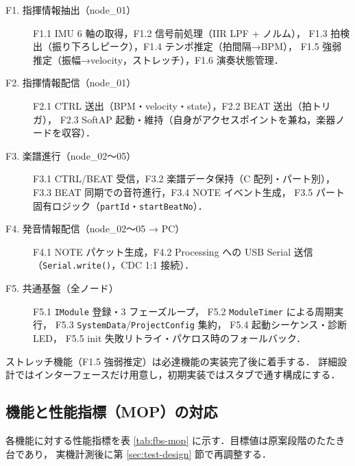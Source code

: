 \documentclass[lualatex,book,paper=a4paper,jafontsize=11.5pt,jafontscale=1.05]{jlreq}
\begin{document}
\begin{description}
  \item[F1. 指揮情報抽出（node\_01）]
    F1.1 IMU 6 軸の取得，F1.2 信号前処理（IIR LPF + ノルム），
    F1.3 拍検出（振り下ろしピーク），F1.4 テンポ推定（拍間隔→BPM），
    F1.5 強弱推定（振幅→velocity，ストレッチ），F1.6 演奏状態管理．
  \item[F2. 指揮情報配信（node\_01）]
    F2.1 CTRL 送出（BPM・velocity・state），F2.2 BEAT 送出（拍トリガ），
    F2.3 SoftAP 起動・維持（自身がアクセスポイントを兼ね，楽器ノードを収容）．
  \item[F3. 楽譜進行（node\_02〜05）]
    F3.1 CTRL/BEAT 受信，F3.2 楽譜データ保持（C 配列・パート別），
    F3.3 BEAT 同期での音符進行，F3.4 NOTE イベント生成，
    F3.5 パート固有ロジック（\texttt{partId}・\texttt{startBeatNo}）．
  \item[F4. 発音情報配信（node\_02〜05 → PC）]
    F4.1 NOTE パケット生成，F4.2 Processing への USB Serial 送信
    （\texttt{Serial.write()}，CDC 1:1 接続）．
  \item[F5. 共通基盤（全ノード）]
    F5.1 \texttt{IModule} 登録・3 フェーズループ，
    F5.2 \texttt{ModuleTimer} による周期実行，
    F5.3 \texttt{SystemData}/\texttt{ProjectConfig} 集約，
    F5.4 起動シーケンス・診断 LED，
    F5.5 init 失敗リトライ・パケロス時のフォールバック．
\end{description}

ストレッチ機能（F1.5 強弱推定）は必達機能の実装完了後に着手する．
詳細設計ではインターフェースだけ用意し，初期実装ではスタブで通す構成にする．

\subsection{機能と性能指標（MOP）の対応}

各機能に対する性能指標を表 \ref{tab:fbs-mop} に示す．目標値は原案段階のたたき台であり，
実機計測後に第 \ref{sec:test-design} 節で再調整する．
\end{document}
